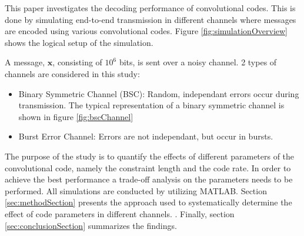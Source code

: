 This paper investigates the decoding performance of convolutional codes. This is done by simulating end-to-end transmission in different channels where messages are encoded using various convolutional codes.
Figure \ref{fig:simulationOverview} shows the logical setup of the simulation.



A message, $\textbf{x}$, consisting of $10^6$ bits, is sent over a noisy channel. 2 types of channels are considered in this study:
\begin{itemize}\setlength\itemsep{0pt}
   \item Binary Symmetric Channel (BSC): Random, independant errors occur during transmission. The typical representation of a binary symmetric channel is shown in figure \ref{fig:bscChannel}
   \item Burst Error Channel: Errors are not independant, but occur in bursts.
\end{itemize}



The purpose of the study is to quantify the effects of different parameters of the convolutional code, namely the constraint length and the code rate. In order to achieve the best performance a trade-off analysis on the parameters needs to be performed. 
All simulations are conducted by utilizing MATLAB. Section \ref{sec:methodSection} presents the approach used to systematically determine the effect of code parameters in different channels. . Finally, section \ref{sec:conclusionSection} summarizes the findings.

